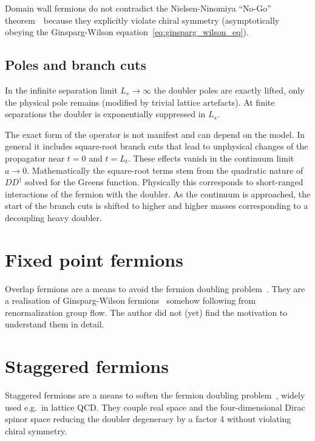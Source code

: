 \documentclass[a4paper]{article}
\newcommand{\nnt}{Nielsen-Ninomiya ``No-Go'' theorem~\cite{NIELSEN1981219}}
\begin{document}
	Domain wall fermions do not contradict the \nnt\ because they explicitly violate chiral symmetry (asymptotically obeying the Ginsparg-Wilson equation~\eqref{eq:ginsparg_wilson_eq}).
	
	\subsection{Poles and branch cuts}
	In the infinite separation limit $L_s\rightarrow\infty$ the doubler poles are exactly lifted, only the physical pole remains (modified by trivial lattice artefacts). At finite separations the doubler is exponentially suppressed in $L_s$.
	
	The exact form of the operator is not manifest and can depend on the model. In general it includes square-root branch cuts that lead to unphysical changes of the propagator near $t=0$ and $t=L_t$. These effects vanish in the continuum limit $a\rightarrow0$. Mathematically the square-root terms stem from the quadratic nature of $DD^\dagger$ solved for the Greens function. Physically this corresponds to short-ranged interactions of the fermion with the doubler. As the continuum is approached, the start of the branch cuts is shifted to higher and higher masses corresponding to a decoupling heavy doubler.
	
	\section{Fixed point fermions}
	Overlap fermions are a means to avoid the fermion doubling problem~\cite{Gattringer:2010zz}. They are a realisation of Ginsparg-Wilson fermions~\cite{Ginsparg_Wilson} somehow following from renormalization group flow. The author did not (yet) find the motivation to understand them in detail.
	
	\section{Staggered fermions}
	Staggered fermions are a means to soften the fermion doubling problem~\cite{staggered_fermions,Gattringer:2010zz,Rothe:2005,smit_2002,Intro_chiral_sym}, widely used e.g.\ in lattice QCD. They couple real space and the four-dimensional Dirac spinor space reducing the doubler degeneracy by a factor 4 without violating chiral symmetry.
	
\end{document}
